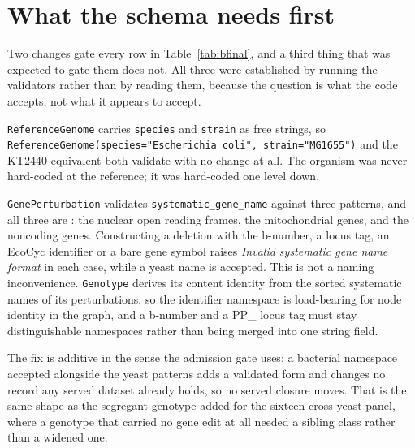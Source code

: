 
\section{What the schema needs first}\label{sec:schema}

Two changes gate every row in Table~\ref{tab:bfinal}, and a third thing that was
expected to gate them does not. All three were established by running the validators
rather than by reading them, because the question is what the code accepts, not what it
appears to accept.



 \texttt{ReferenceGenome} carries
\texttt{species} and \texttt{strain} as free strings, so
\texttt{ReferenceGenome(species="Escherichia coli", strain="MG1655")} and the
 KT2440 equivalent both validate with no change at all. The
organism was never hard-coded at the reference; it was hard-coded one level down.

 \texttt{GenePerturbation}
validates \texttt{systematic\_gene\_name} against three patterns, and all three are
: the nuclear open reading frames, the mitochondrial genes, and the
noncoding genes. Constructing a deletion with the  b-number, a  locus tag, an EcoCyc identifier or a bare gene symbol raises \emph{Invalid
systematic gene name format} in each case, while a yeast name is accepted. This is not a
naming inconvenience. \texttt{Genotype} derives its content identity from the sorted
systematic names of its perturbations, so the identifier namespace is load-bearing for
node identity in the graph, and a b-number and a PP\_ locus tag must stay distinguishable
namespaces rather than being merged into one string field.

The fix is additive in the sense the admission gate uses: a bacterial namespace accepted
alongside the yeast patterns adds a validated form and changes no record any served
dataset already holds, so no served closure moves. That is the same shape as the
segregant genotype added for the sixteen-cross yeast panel, where a genotype that carried
no gene edit at all needed a sibling class rather than a widened one.

